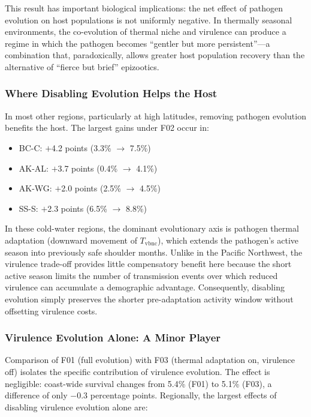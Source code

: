 This result has important biological implications: the net effect of
pathogen evolution on host populations is not uniformly negative.  In
thermally seasonal environments, the co-evolution of thermal niche and
virulence can produce a regime in which the pathogen becomes ``gentler
but more persistent''---a combination that, paradoxically, allows
greater host population recovery than the alternative of ``fierce but
brief'' epizootics.

\subsubsection{Where Disabling Evolution Helps the Host}

In most other regions, particularly at high latitudes, removing
pathogen evolution benefits the host.  The largest gains under F02
occur in:

\begin{itemize}
  \item BC-C: $+$4.2 points (3.3\% $\rightarrow$ 7.5\%)
  \item AK-AL: $+$3.7 points (0.4\% $\rightarrow$ 4.1\%)
  \item AK-WG: $+$2.0 points (2.5\% $\rightarrow$ 4.5\%)
  \item SS-S: $+$2.3 points (6.5\% $\rightarrow$ 8.8\%)
\end{itemize}

\noindent
In these cold-water regions, the dominant evolutionary axis is pathogen
thermal adaptation (downward movement of $T_\mathrm{vbnc}$), which
extends the pathogen's active season into previously safe shoulder
months.  Unlike in the Pacific Northwest, the virulence trade-off
provides little compensatory benefit here because the short active
season limits the number of transmission events over which reduced
virulence can accumulate a demographic advantage.  Consequently,
disabling evolution simply preserves the shorter pre-adaptation
activity window without offsetting virulence costs.

\subsubsection{Virulence Evolution Alone: A Minor Player}

Comparison of F01 (full evolution) with F03 (thermal adaptation on,
virulence off) isolates the specific contribution of virulence
evolution.  The effect is negligible: coast-wide survival changes from
5.4\% (F01) to 5.1\% (F03), a difference of only $-$0.3 percentage
points.  Regionally, the largest effects of disabling virulence
evolution alone are:

